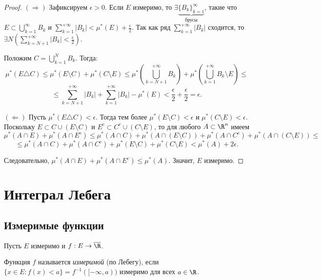 \begin{proof}

    $(\Rightarrow)$ Зафиксируем $\epsilon > 0$. Если $E$ измеримо, то $\exists \underbrace{\{B_{k}\}_{k = 1}^{\infty}}_{\text{брусы}}$, такие что $E \subset \bigcup_{k = 1}^{\infty}B_{k}$ и $\sum_{k = 1}^{+\infty}|B_{k}| < \mu^{*}(E) + \frac{\epsilon}{2}$. Так как ряд $\sum_{k = 1}^{+\infty}|B_{k}|$ сходится, то $\exists N \left(\sum_{k = N + 1}^{+\infty}|B_{k}| < \frac{\epsilon}{2}\right)$.

    Положим $C = \bigcup_{k = 1}^{N} B_{k}$. Тогда:
    \[\mu^{*}(E \triangle C) \leq \mu^{*}(E \setminus C) + \mu^{*}(C \setminus E) \leq \mu^{*}\left(\bigcup_{k = N + 1}^{+\infty}B_{k}\right) + \mu^{*}\left(\bigcup_{k = 1}^{+\infty}B_{k} \setminus E\right) \leq\]
    \[\leq \sum_{k = N + 1}^{+\infty}|B_{k}| + \sum_{k = 1}^{+\infty}|B_{k}| - \mu^{*}(E) < \frac{\epsilon}{2} + \frac{\epsilon}{2} = \epsilon.\]

    $(\Leftarrow)$ Пусть $\mu^{*}(E \triangle C) < \epsilon$. Тогда тем более $\mu^{*}(E \setminus C) < \epsilon$ и $\mu^{*}(C \setminus E) < \epsilon$. Поскольку $E \subset C \cup (E \setminus C)$ и $E^{c} \subset C^{c} \cup (C \setminus E)$, то для любого $A \subset \R^{n}$ имеем
    \[\mu^{*}(A \cap E) + \mu^{*}(A \cap E^{c}) \leq \mu^{*}(A \cap C) + \mu^{*}(A \cap (E \setminus C)) + \mu^{*}(A \cap C^{c}) + \mu^{*}(A \cap (C \setminus E)) \leq\]
    \[\leq \mu^{*}(A \cap C) + \mu^{*}(A \cap C^{c}) + \mu^{*}(E \setminus C) + \mu^{*}(C \setminus E) < \mu^{*}(A) + 2\epsilon.\]

    Следовательно, $\mu^{*}(A \cap E) + \mu^{*}(A \cap E^{c}) \leq \mu^{*}(A)$. Значит, $E$ измеримо.
\end{proof}

\section{Интеграл Лебега}

\subsection{Измеримые функции}

Пусть $E$ измеримо и $f: E \to \overline{\R}$.
\begin{definition}
    Функция $f$ называется \textit{измеримой} (по Лебегу), если $\{x \in E: f(x) < a\} = f^{-1}([-\infty, a))$ измеримо для всех $a \in \R$.
\end{definition}

